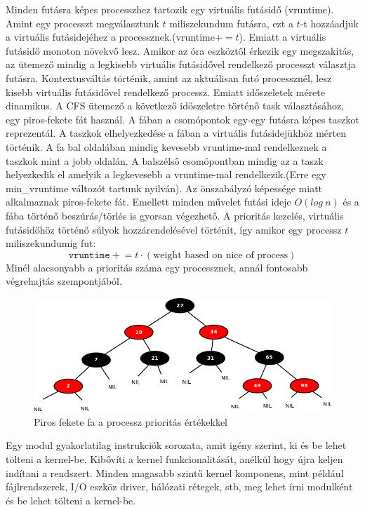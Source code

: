 Minden futásra képes processzhez tartozik egy virtuális futásidő (vruntime). Amint egy processzt megválasztunk $t$ miliszekundum futásra, ezt a $t$-t hozzáadjuk a virtuális futásidejéhez a processznek.(vruntime$+=t$). Emiatt a virtuális futásidő monoton növekvő lesz.
Amikor az óra eszköztől érkezik egy megszakitás, az ütemező mindig a legkisebb virtuális futásidővel rendelkező processzt választja futásra. Kontextusváltás történik, amint az aktuálisan futó processznél, lesz kisebb virtuális futásidővel rendelkező processz. Emiatt időszeletek mérete dinamikus. 
A CFS ütemező a következő időszeletre történő task választásához, egy piros-fekete fát használ. A fában a csomópontok egy-egy futásra képes taszkot reprezentál. A taszkok elhelyezkedése a fában a virtuális futásidejükhöz mérten történik. A fa bal oldalában mindig kevesebb vruntime-mal rendelkeznek a taszkok mint a jobb oldalán. A balszélső csomópontban mindig az a taszk helyezkedik el amelyik a legkevesebb a vruntime-mal rendelkezik.(Erre egy min\_vruntime változót tartunk nyilván). Az önszabályzó képessége miatt alkalmaznak piros-fekete fát. Emellett minden művelet futási ideje $O(log\ n)$ és a fába történő beszúrás/törlés is gyorsan végezhető.
A prioritás kezelés, virtuális futásidőhöz történő súlyok hozzárendelésével történit, így amikor egy processz $t$ miliszekundumig fut:
\[
\texttt{vruntime} \mathrel{+}= t \cdot (\text{weight based on nice of process})
\]
Minél alacsonyabb a prioritás száma egy processznek, annál fontosabb végrehajtás szempontjából.
\begin{figure}[h]
\centering
\includegraphics[width=\textwidth]{images/rb_tree.png}
\caption{Piros fekete fa a processz prioritás értékekkel}
\label{fig:rb_tree}
\end{figure}
Egy modul gyakorlatilag instrukciók sorozata, amit igény szerint, ki és be lehet tölteni a kernel-be. Kibővíti a kernel funkcionalitását, anélkül hogy újra keljen indítani a rendszert. Minden magasabb szintű kernel komponens, mint például fájlrendszerek, I/O eszköz driver, hálózati rétegek, stb, meg lehet írni modulként és be lehet tölteni a kernel-be.

